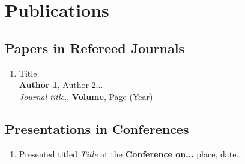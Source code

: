 \documentclass[PhD,synopsis]{iitmdiss}
\begin{document}
\section{Publications}
\subsection{Papers in Refereed Journals}
\begin{enumerate}
\item Title \\
	{\bf Author 1}, Author 2...\\
	{\it Journal title.}, {\bf Volume}, Page (Year)
\end{enumerate}

\subsection{Presentations in Conferences}
\begin{enumerate}
\item  Presented titled  {\em Title} at the {\bf Conference on...}  place, date..
\end{enumerate}
\end{document}
